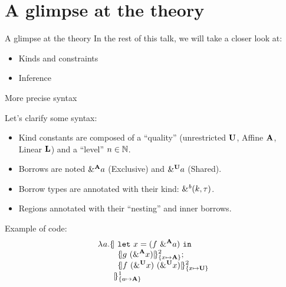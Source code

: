 \documentclass[xcolor=svgnames,11pt]{beamer}
\begin{document}






\section{A glimpse at the theory}


\begin{frame}{A glimpse at the theory}
  In the rest of this talk, we will take a closer look at:
  \begin{itemize}
  \item Kinds and constraints
  \item Inference
  \end{itemize}
\end{frame}

\begin{frame}[fragile]{More precise syntax}

  Let's clarify some syntax:

  \begin{itemize}
  \item
    Kind constants are composed of a ``quality'' (unrestricted $\kun$, Affine $\kaff$, Linear $\klin$) and a ``level'' $n\in\Nat$.
  \item
    Borrows are noted
    $\borrow[\kaff]{a}$ (Exclusive) and $\borrow[\kun]{a}$ (Shared).
  \item
    Borrow types are annotated with their kind: $\borrowty{k}{\tau}$.
  \item
    Regions annotated
    with their ``nesting'' and inner borrows.
  \end{itemize}

  Example of code:
\[
  \setlength{\jot}{-1pt}
  \begin{aligned}
  \lam{a}{}\region[1]{\Sone a\MBORROW}{\ &%
  \letin{x}{\app{f}{\borrow[\kaff]{a}}}{}\\
  &\region[2]{\Sone x\MBORROW}{g\ (\borrow[\kaff]{x})};\\
  &\region[2]{\Sone x\IBORROW}{f\ (\borrow[\kun]{x})\ (\borrow[\kun]{x})}\\
  &\!\!\!}
\end{aligned}
\]
\end{frame}
\end{document}
